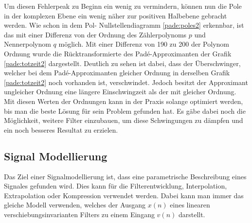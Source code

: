 Um diesen Fehlerpeak zu Beginn ein wenig zu vermindern, können nun die Pole in der komplexen Ebene ein wenig näher zur positiven Halbebene gebracht werden.
Wie schon in  dem Pol- Nullstellendiagramm \ref{pade:poles2} erkennbar, ist das mit einer Differenz von der Ordnung des Zählerpolynoms $p$ und Nennerpolynom $q$ möglich.
Mit einer Differenz von 190 zu 200 der Polynom Ordnung wurde die Rücktransformierte des Padé-Approximanten der Grafik \ref{pade:totzeit2} dargestellt.
Deutlich zu sehen ist dabei, dass der Überschwinger, welcher bei dem Padé-Approximanten gleicher Ordnung in derselben Grafik \ref{pade:totzeit2} noch vorhanden ist, verschwindet.
Jedoch besitzt der Approximant ungleicher Ordnung eine längere Einschwingzeit als der mit gleicher Ordnung. 
Mit diesen Werten der Ordnungen kann in der Praxis solange optimiert werden, bis man die beste Lösung für sein Problem gefunden hat.
Es gäbe dabei noch die Möglichkeit, weitere Filter einzubauen, um diese Schwingungen zu dämpfen und ein noch besseres Resultat zu erzielen.


\newpage

\subsection{Signal Modellierung
	\label{pade:subsection:SignalMod}}

Das Ziel einer Signalmodellierung ist, dass eine parametrische Beschreibung eines Signales gefunden wird.
Dies kann für die Filterentwicklung, Interpolation, Extrapolation oder Kompression verwendet werden.
Dabei kann man immer das gleiche Modell verwenden, welches der Ausgang $x(n)$ eines linearen verschiebungsinvarianten Filters zu einem Eingang $v(n)$ darstellt. 
 
\begin{center}
\end{center}

